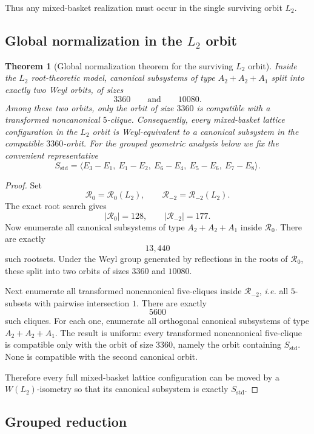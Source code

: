 \documentclass[11pt]{article}
\newtheorem{theorem}{Theorem}[section]
\theoremstyle{definition}
\newcommand{\ie}{\emph{i.e.}}
\begin{document}
Thus any mixed-basket realization must occur in the single surviving orbit $L_2$.

\subsection{Global normalization in the $L_2$ orbit}

\begin{theorem}[Global normalization theorem for the surviving $L_2$ orbit]\label{thm:L2-global-normalization}
Inside the $L_2$ root-theoretic model, canonical subsystems of type $A_2+A_2+A_1$ split into exactly two Weyl orbits, of sizes
\[
3360\qquad\text{and}\qquad 10080.
\]
Among these two orbits, only the orbit of size $3360$ is compatible with a transformed noncanonical $5$-clique. Consequently, every mixed-basket lattice configuration in the $L_2$ orbit is Weyl-equivalent to a canonical subsystem in the compatible $3360$-orbit. For the grouped geometric analysis below we fix the convenient representative
\[
S_{\mathrm{std}}=\langle E_3-E_1,\ E_1-E_2,\ E_6-E_4,\ E_5-E_6,\ E_7-E_8\rangle.
\]
\end{theorem}

\begin{proof}
Set
\[
\mathcal R_0=\mathcal R_0(L_2),\qquad \mathcal R_{-2}=\mathcal R_{-2}(L_2).
\]
The exact root search gives
\[
|\mathcal R_0|=128,
\qquad
|\mathcal R_{-2}|=177.
\]
Now enumerate all canonical subsystems of type $A_2+A_2+A_1$ inside $\mathcal R_0$. There are exactly
\[
13{,}440
\]
such rootsets. Under the Weyl group generated by reflections in the roots of $\mathcal R_0$, these split into two orbits of sizes $3360$ and $10080$.

Next enumerate all transformed noncanonical five-cliques inside $\mathcal R_{-2}$, 
\ie{} all $5$-subsets with pairwise intersection $1$. There are exactly
\[
5600
\]
such cliques. For each one, enumerate all orthogonal canonical subsystems of type $A_2+A_2+A_1$. The result is uniform: every transformed noncanonical five-clique is compatible only with the orbit of size $3360$, namely the orbit containing $S_{\mathrm{std}}$. None is compatible with the second canonical orbit.

Therefore every full mixed-basket lattice configuration can be moved by a $W(L_2)$-isometry so that its canonical subsystem is exactly $S_{\mathrm{std}}$.
\end{proof}

\subsection{Grouped reduction}
\end{document}
